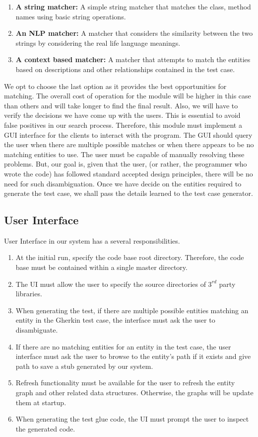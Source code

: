 \documentclass[conference, onecolumn, a4, 12pt]{IEEEtran}
\begin{document}
\begin{enumerate}
	\item \textbf{A string matcher:} A simple string matcher that matches the class, method names using basic string operations.
	\item \textbf{An NLP matcher:} A matcher that considers the similarity between the two strings by considering the real life language meanings.
	\item \textbf{A context based matcher:} A matcher that attempts to match the entities based on descriptions and other relationships contained in the test case.
\end{enumerate}
 We opt to choose the last option as it provides the best opportunities for matching. The overall cost of operation for the module will be higher in this case than others and will take longer to find the final result.\newline
 Also, we will have to verify the decisions we have come up with the users. This is essential to avoid false positives in our search process. Therefore, this module must implement a GUI interface for the clients to interact with the program. The GUI should query the user when there are multiple possible matches or when there appears to be no matching entities to use. The user must be capable of manually resolving these problems. But, our goal is, given that the user, (or rather, the programmer who wrote the code) has followed standard accepted design principles, there will be no need for such disambiguation.\newline
 Once we have decide on the entities required to generate the test case, we shall pass the details learned to the test case generator.
 
\subsection{User Interface}
User Interface in our system has a several responsibilities.
\begin{enumerate}
	\item At the initial run, specify the code base root directory. Therefore, the code base must be contained within a single master directory.
	\item The UI must allow the user to specify the source directories of $3^{rd}$ party libraries.
	\item When generating the test, if there are multiple possible entities matching an entity in the Gherkin test case, the interface must ask the user to disambiguate.
	\item If there are no matching entities for an entity in the test case, the user interface must ask the user to browse to the entity's path if it exists and give path to save a stub generated by our system. 
	\item Refresh functionality must be available for the user to refresh the entity graph and other related data structures. Otherwise, the  graphs will be update them at startup.
	\item When generating the test glue code, the UI must prompt the user to inspect the generated code.
	
\end{enumerate}
\end{document}
